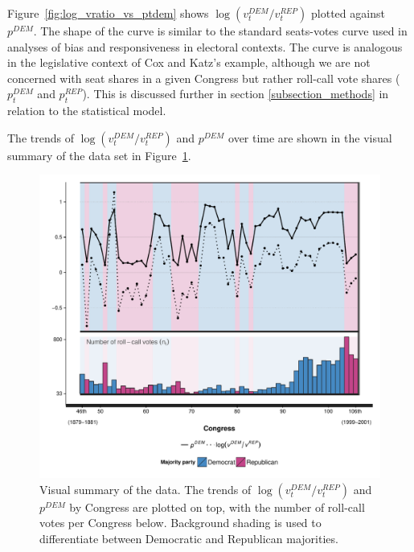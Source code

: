 Figure~\ref{fig:log_vratio_vs_ptdem} shows $\log{(v_t^{DEM} / v_t^{REP} )}$ plotted against $p^{DEM}$. The shape of the curve is similar to the standard seats-votes curve used in analyses of bias and responsiveness in electoral contexts. The curve is analogous in the legislative context of Cox and Katz's example, although we are not concerned with seat shares in a given Congress but rather roll-call vote shares ($p_t^{DEM}$ and $p_t^{REP}$). This is discussed further in section \ref{subsection_methods} in relation to the statistical model. 

The trends of $\log{(v_t^{DEM} / v_t^{REP} )}$ and $p^{DEM}$ over time are shown in the visual summary of the data set in Figure~\ref{fig:data_summary}.


\begin{figure}[p]
\centering
	\includegraphics[scale=0.75]{sections/figs/vis_summary}
\caption{Visual summary of the data. The trends of $\log{(v_t^{DEM} / v_t^{REP} )}$ and $p^{DEM}$ by Congress are plotted on top, with the number of roll-call votes per Congress below. Background shading is used to differentiate between Democratic and Republican majorities.}
\label{fig:data_summary}
\end{figure}
%

%

